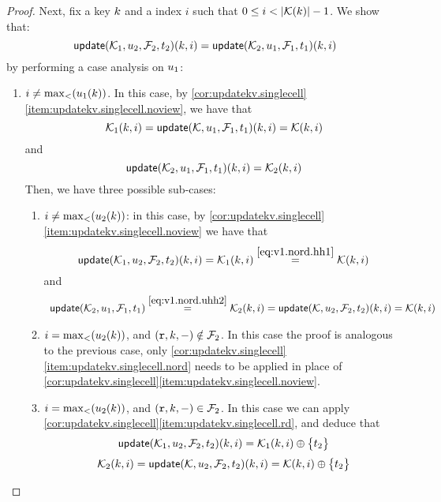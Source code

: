 \begin{proof}
Next, fix a key $k$ and a index $i$ such that $0 \leq i < \lvert  \mathcal{K}(k)  \rvert - 1$. 
We show that:
\[ 
    \mathsf{update}(\mathcal{K}_1,u_2,\mathcal{F}_2,t_2)(k, i) = \mathsf{update}(\mathcal{K}_2, u_1, \mathcal{F}_1, t_1)(k, i)
\]
by performing a case analysis on $u_1$: 
\begin{enumerate}
    \item $i \neq \max_{<}(u_1(k))$. 
In this case, by \cref{cor:updatekv.singlecell}\cref{item:updatekv.singlecell.noview}, 
we have that 
\begin{equation}
\mathcal{K}_1(k, i) = \mathsf{update}(\mathcal{K}, u_1, \mathcal{F}_1, t_1)(k, i) = \mathcal{K}(k, i)
\label{eq:v1.nord.hh1}
\end{equation}
and 
\begin{equation}
\mathsf{update}(\mathcal{K}_2, u_1, \mathcal{F}_1, t_1)(k, i) = \mathcal{K}_2(k, i)
\label{eq:v1.nord.uhh2}
\end{equation}
Then, we have three possible sub-cases: 
\begin{enumerate}
    \item $i \neq \max_{<}(u_2(k))$: in this case, by \cref{cor:updatekv.singlecell}\cref{item:updatekv.singlecell.noview} we have that 
\[\updateKV(\hh_1, \vi_2, \opset_2, \txid_2)(\ke, i) = 
\hh_1(\ke, i) \stackrel{\cref{eq:v1.nord.hh1}}{=} \hh(\ke, i)
\]
and
\[
\begin{array}{l}
\updateKV(\hh_2, \vi_1, \opset_1, \txid_1) \stackrel{\cref{eq:v1.nord.uhh2}}{=} \hh_2(\ke,i) = 
\updateKV(\hh, \vi_2, \opset_2, \txid_2)(\ke, i) = \hh(\ke, i)
\end{array}
\]
\item $i = \max_{<}(u_2(k))$, and $(\textnormal{\texttt r}, k, -) \notin \mathcal{F}_2$. In this case the proof is analogous to the previous case, 
only \cref{cor:updatekv.singlecell}\cref{item:updatekv.singlecell.nord} needs to be applied in place 
of \cref{cor:updatekv.singlecell}\cref{item:updatekv.singlecell.noview}.
\item $i = \max_{<}(u_2(k))$, and $(\textnormal{\texttt r}, k, -) \in \mathcal{F}_2$. In this case we can apply \cref{cor:updatekv.singlecell}\cref{item:updatekv.singlecell.rd}, 
and deduce that 
\begin{equation}
\updateKV(\hh_1, \vi_2, \opset_2, \txid_2)(\ke, i) = \hh_1(\ke, i) \oplus \Set{\txid_2}
\label{eq:v1.nord.v2.rd.uhh1}
\end{equation}
\begin{equation}
\hh_2(\ke, i) = \updateKV(\hh, \vi_2, \opset_2, \txid_2)(\ke, i) = \hh(\ke,i) \oplus \Set{\txid_2}
\label{eq:v1.nord.v2.rd.hh2}
\end{equation}

\end{enumerate}
\end{enumerate}
\end{proof}
